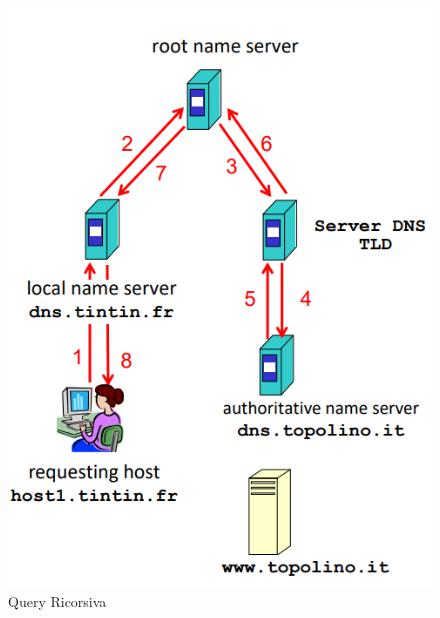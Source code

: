\documentclass{article}
\begin{document}
\begin{figure}[htbp]
    \centering
    \begin{minipage}{0.35\textwidth}
        \centering
        \includegraphics[width=\linewidth]{img/queryRicorsiva.png}
        \caption{Query Ricorsiva}
    \end{minipage}
    \hspace{0.8cm}  
    \begin{minipage}{0.37\textwidth}
        \centering

\end{minipage}
\end{figure}
\end{document}
